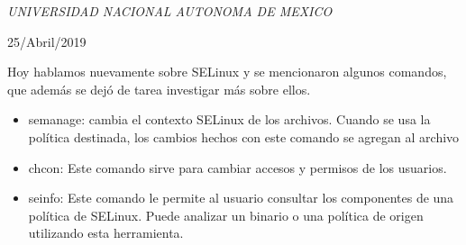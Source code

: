 \documentclass[a4paper, 11pt, oneside]{article}
\begin{document}
\begin{titlepage}
	\textit{UNIVERSIDAD NACIONAL AUTONOMA DE MEXICO} 
	
	\vfill
	
	
	
	
	\vspace{0.3\baselineskip} 
	
	25/Abril/2019 
	
	 

\end{titlepage}
Hoy hablamos nuevamente sobre SELinux y se mencionaron algunos comandos, que además se dejó de tarea investigar más sobre ellos.
\begin{itemize}
    \item semanage:  cambia el contexto SELinux de los archivos. Cuando se usa la política destinada, los cambios hechos con este comando se agregan al archivo 
    \item chcon: Este comando sirve para cambiar accesos y permisos de los usuarios.
    \item seinfo: Este comando le permite al usuario consultar los componentes de una política de SELinux. Puede analizar un binario o una política de origen utilizando esta herramienta.
\end{itemize}
\end{document}
